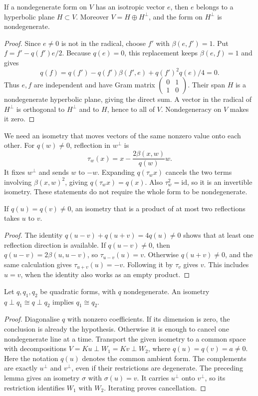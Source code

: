 \begin{lemma}\label{geometry:lem:hyperbolic}
If a nondegenerate form on $V$ has an isotropic vector $e$, then $e$
belongs to a hyperbolic plane $H\subset V$. Moreover
$V=H\oplus H^\perp$, and the form on $H^\perp$ is nondegenerate.
\end{lemma}
\begin{proof}
Since $e\ne0$ is not in the radical, choose $f'$ with $\beta(e,f')=1$.
Put $f=f'-q(f')e/2$. Because $q(e)=0$, this replacement keeps $\beta(e,f)=1$ and gives
\[
 q(f)=q(f')-q(f')\beta(f',e)+q(f')^2q(e)/4=0.
\]
Thus $e,f$ are independent and have Gram matrix
$\left(\begin{smallmatrix}0&1\\1&0\end{smallmatrix}\right)$.
Their span $H$ is a nondegenerate hyperbolic plane, giving the direct sum.
A vector in the radical of $H^\perp$ is orthogonal to $H^\perp$ and
to $H$, hence to all of $V$. Nondegeneracy on $V$ makes it zero.
\end{proof}

We need an isometry that moves vectors of the same nonzero value onto
each other. For $q(w)\ne0$, reflection in $w^\perp$ is
\[
 \tau_w(x)=x-\frac{2\beta(x,w)}{q(w)}w.
\]
It fixes $w^\perp$ and sends $w$ to $-w$.
Expanding $q(\tau_wx)$ cancels the two terms involving
$\beta(x,w)^2$, giving $q(\tau_wx)=q(x)$.
Also $\tau_w^2=\mathrm{id}$, so it is an invertible isometry.
These statements do not require the whole form to be nondegenerate.

\begin{lemma}\label{geometry:lem:transitive}
If $q(u)=q(v)\ne0$, an isometry that is a product of at most two
reflections takes $u$ to $v$.
\end{lemma}
\begin{proof}
The identity
$q(u-v)+q(u+v)=4q(u)\ne0$ shows that at least one reflection direction
is available. If $q(u-v)\ne0$, then
$q(u-v)=2\beta(u,u-v)$, so $\tau_{u-v}(u)=v$.
Otherwise $q(u+v)\ne0$, and the same calculation gives
$\tau_{u+v}(u)=-v$. Following it by $\tau_v$ gives $v$.
This includes $u=v$, when the identity also works as an empty product.
\end{proof}

\begin{theorem}\label{geometry:thm:witt}
Let $q,q_1,q_2$ be quadratic forms, with $q$ nondegenerate.
An isometry $q\perp q_1\cong q\perp q_2$ implies $q_1\cong q_2$.
\end{theorem}
\begin{proof}
Diagonalise $q$ with nonzero coefficients. If its dimension is zero,
the conclusion is already the hypothesis. Otherwise it is enough to
cancel one nondegenerate line at a time.
Transport the given isometry to a common space with decompositions
$V=Ku\perp W_1=Kv\perp W_2$, where $q(u)=q(v)=a\ne0$.
Here the notation $q(u)$ denotes the common ambient form.
The complements are exactly $u^\perp$ and $v^\perp$, even if their
restrictions are degenerate. The preceding lemma gives an isometry
$\sigma$ with $\sigma(u)=v$. It carries $u^\perp$ onto $v^\perp$,
so its restriction identifies $W_1$ with $W_2$. Iterating proves cancellation.
\end{proof}

